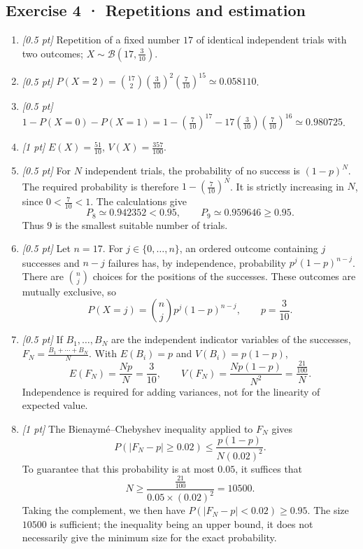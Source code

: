 \subsection*{Exercise 4 · Repetitions and estimation}\begin{enumerate}

\item \textit{[0.5 pt]} Repetition of a fixed number $17$ of identical independent trials with two outcomes; $X\sim\mathcal B(17,\frac{3}{10})$.

\item \textit{[0.5 pt]} $P(X=2)=\binom{17}2(\frac{3}{10})^2(\frac{7}{10})^{15}\simeq0.058110$.

\item \textit{[0.5 pt]} $1-P(X=0)-P(X=1)=1-(\frac{7}{10})^{17}-17(\frac{3}{10})(\frac{7}{10})^{16}\simeq0.980725$.

\item \textit{[1 pt]} $E(X)=\frac{51}{10}$, $V(X)=\frac{357}{100}$.

\item \textit{[0.5 pt]} For $N$ independent trials, the probability of no success is $(1-p)^N$. The required probability is therefore $1-(\frac{7}{10})^N$. It is strictly increasing in $N$, since $0<\frac{7}{10}<1$. The calculations give
\[P_{8}\simeq0.942352<0.95,\qquad P_{9}\simeq0.959646\ge0.95.\]
Thus $9$ is the smallest suitable number of trials.

\item \textit{[0.5 pt]} Let $n=17$. For $j\in\{0,\ldots,n\}$, an ordered outcome containing $j$ successes and $n-j$ failures has, by independence, probability $p^j(1-p)^{n-j}$. There are $\binom nj$ choices for the positions of the successes. These outcomes are mutually exclusive, so
\[P(X=j)=\binom nj p^j(1-p)^{n-j},\qquad p=\frac{3}{10}.\]

\item \textit{[0.5 pt]} If $B_1,\ldots,B_N$ are the independent indicator variables of the successes, $F_N=\frac{B_1+\cdots+B_N}{N}$. With $E(B_i)=p$ and $V(B_i)=p(1-p)$,
\[E(F_N)=\frac{Np}{N}=\frac{3}{10},\qquad V(F_N)=\frac{Np(1-p)}{N^2}=\frac{\frac{21}{100}}{N}.\]
Independence is required for adding variances, not for the linearity of expected value.

\item \textit{[1 pt]} The Bienaymé–Chebyshev inequality applied to $F_N$ gives
\[P(|F_N-p|\ge0.02)\le\frac{p(1-p)}{N(0.02)^2}.\]
To guarantee that this probability is at most $0.05$, it suffices that
\[N\ge\frac{\frac{21}{100}}{0.05\times(0.02)^2}=10500.\]
Taking the complement, we then have $P(|F_N-p|<0.02)\ge0.95$. The size $10500$ is sufficient; the inequality being an upper bound, it does not necessarily give the minimum size for the exact probability.

\end{enumerate}

